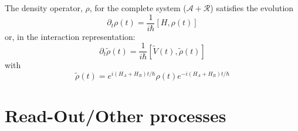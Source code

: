 The density operator, $\rho$, for the complete system ($\mathcal{A} + \mathcal{R}$) satisfies the evolution
\begin{equation}
  \partial_t \rho(t) = \frac{1}{i\hbar}\left[H,\rho(t)\right]
\end{equation}
or, in the interaction representation:
\begin{equation}
  \partial_t \tilde{\rho}(t) =
  \frac{1}{i\hbar}\left[\tilde{V}(t),\tilde{\rho}(t)\right]
\end{equation}
with
\begin{equation}
  \tilde{\rho}(t) = e^{i(H_A+H_R)t/\hbar} \rho(t) e^{-i(H_A+H_R)t/\hbar}
\end{equation}



\section{Read-Out/Other processes}
